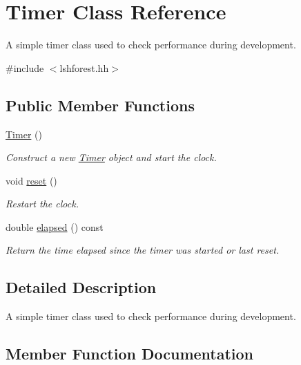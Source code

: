 \hypertarget{classTimer}{}\section{Timer Class Reference}
\label{classTimer}


A simple timer class used to check performance during development.  




{\ttfamily \#include $<$lshforest.\+hh$>$}

\subsection*{Public Member Functions}
\begin{DoxyCompactItemize}
\item 
\mbox{\label{classTimer_a5f16e8da27d2a5a5242dead46de05d97}} 
\hyperlink{classTimer_a5f16e8da27d2a5a5242dead46de05d97}{Timer} ()
\begin{DoxyCompactList}\small\item\em Construct a new \hyperlink{classTimer}{Timer} object and start the clock. \end{DoxyCompactList}\item 
\mbox{\label{classTimer_a9020542d73357a4eef512eefaf57524b}} 
void \hyperlink{classTimer_a9020542d73357a4eef512eefaf57524b}{reset} ()
\begin{DoxyCompactList}\small\item\em Restart the clock. \end{DoxyCompactList}\item 
double \hyperlink{classTimer_a6a89a613c2af9b0d1e5f7e4ba9e46c54}{elapsed} () const
\begin{DoxyCompactList}\small\item\em Return the time elapsed since the timer was started or last reset. \end{DoxyCompactList}\end{DoxyCompactItemize}


\subsection{Detailed Description}
A simple timer class used to check performance during development. 

\subsection{Member Function Documentation}
\mbox{\label{classTimer_a6a89a613c2af9b0d1e5f7e4ba9e46c54}} 
